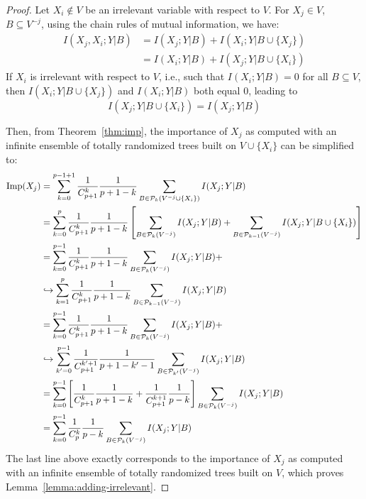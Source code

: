 \begin{proof}
Let $X_i \notin V$ be an irrelevant variable with respect to $V$. For $X_j \in
V$, $B \subseteq V^{-j}$, using the chain rules of mutual information, we have:
\begin{align}
I(X_j, X_i;Y|B) &= I(X_j;Y|B) + I(X_i;Y|B \cup \{X_j\})  \\
                &= I(X_i;Y|B) + I(X_j;Y|B \cup \{X_i\})
\end{align}
If $X_i$ is irrelevant with respect to $V$, i.e., such that $I(X_i;Y|B)=0$ for
all $B\subseteq V$, then $I(X_i;Y|B \cup \{X_j\})$ and $I(X_i;Y|B)$ both equal
$0$, leading to
\begin{equation}
I(X_j;Y|B \cup \{X_i\}) = I(X_j;Y|B)
\end{equation}

Then, from Theorem~\ref{thm:imp}, the importance of $X_j$ as computed with an
infinite ensemble of totally randomized trees built on $V\cup \{X_i\}$ can be
simplified to:
\begin{align}
  \text{Imp}(X_j)&=\sum_{k=0}^{p-1+1} \frac{1}{C_{p+1}^k} \frac{1}{p+1-k} \sum_{B \in {\cal P}_k(V^{-j} \cup \{X_i\})} I(X_j;Y|B)\nonumber\\
          &=\sum_{k=0}^{p} \frac{1}{C_{p+1}^k} \frac{1}{p+1-k} \left[ \sum_{B \in {\cal P}_k(V^{-j})} I(X_j;Y|B) + \sum_{B \in {\cal P}_{k-1}(V^{-j})} I(X_j;Y|B \cup \{X_i\})  \right] \nonumber\\
          &=\sum_{k=0}^{p-1} \frac{1}{C_{p+1}^k} \frac{1}{p+1-k} \sum_{B \in {\cal P}_k(V^{-j})} I(X_j;Y|B) + \nonumber\\
          & \hookrightarrow \sum_{k=1}^{p} \frac{1}{C_{p+1}^k} \frac{1}{p+1-k} \sum_{B \in {\cal P}_{k-1}(V^{-j})} I(X_j;Y|B)\nonumber\\
          &=\sum_{k=0}^{p-1} \frac{1}{C_{p+1}^k} \frac{1}{p+1-k} \sum_{B \in {\cal P}_k(V^{-j})} I(X_j;Y|B) + \nonumber\\
          & \hookrightarrow \sum_{k'=0}^{p-1} \frac{1}{C_{p+1}^{k'+1}} \frac{1}{p+1-k'-1} \sum_{B \in {\cal P}_{k'}(V^{-j})} I(X_j;Y|B)\nonumber\\
          &=\sum_{k=0}^{p-1} \left[ \frac{1}{C_{p+1}^k} \frac{1}{p+1-k} + \frac{1}{C_{p+1}^{k+1}} \frac{1}{p-k} \right] \sum_{B \in {\cal P}_k(V^{-j})} I(X_j;Y|B)\nonumber\\
          &=\sum_{k=0}^{p-1} \frac{1}{C^k_p} \frac{1}{p-k} \sum_{B \in {\cal P}_k(V^{-j})} I(X_j;Y|B)
\end{align}
The last line above exactly corresponds to the importance of $X_j$ as computed
with an infinite ensemble of totally randomized trees built on $V$, which proves
Lemma~\ref{lemma:adding-irrelevant}.
\end{proof}

